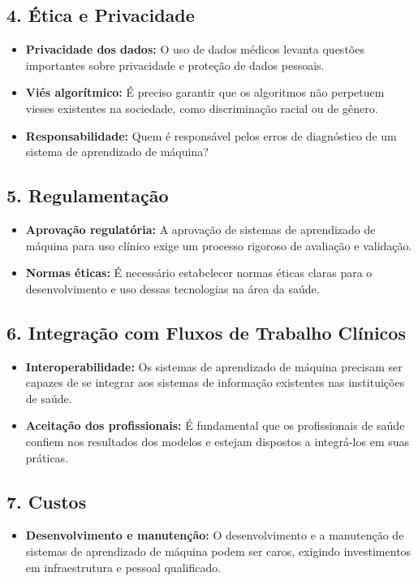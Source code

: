 \documentclass[12pt,a4paper,oneside,openany]{article}
\begin{document}
\subsection*{4. Ética e Privacidade}
\begin{itemize}
    \item \textbf{Privacidade dos dados:} O uso de dados médicos levanta questões importantes sobre privacidade e proteção de dados pessoais.
    \item \textbf{Viés algorítmico:} É preciso garantir que os algoritmos não perpetuem vieses existentes na sociedade, como discriminação racial ou de gênero.
    \item \textbf{Responsabilidade:} Quem é responsável pelos erros de diagnóstico de um sistema de aprendizado de máquina?
\end{itemize}

\subsection*{5. Regulamentação}
\begin{itemize}
    \item \textbf{Aprovação regulatória:} A aprovação de sistemas de aprendizado de máquina para uso clínico exige um processo rigoroso de avaliação e validação.
    \item \textbf{Normas éticas:} É necessário estabelecer normas éticas claras para o desenvolvimento e uso dessas tecnologias na área da saúde.
\end{itemize}

\subsection*{6. Integração com Fluxos de Trabalho Clínicos}
\begin{itemize}
    \item \textbf{Interoperabilidade:} Os sistemas de aprendizado de máquina precisam ser capazes de se integrar aos sistemas de informação existentes nas instituições de saúde.
    \item \textbf{Aceitação dos profissionais:} É fundamental que os profissionais de saúde confiem nos resultados dos modelos e estejam dispostos a integrá-los em suas práticas.
\end{itemize}

\subsection*{7. Custos}
\begin{itemize}
    \item \textbf{Desenvolvimento e manutenção:} O desenvolvimento e a manutenção de sistemas de aprendizado de máquina podem ser caros, exigindo investimentos em infraestrutura e pessoal qualificado.
\end{itemize}
\end{document}
